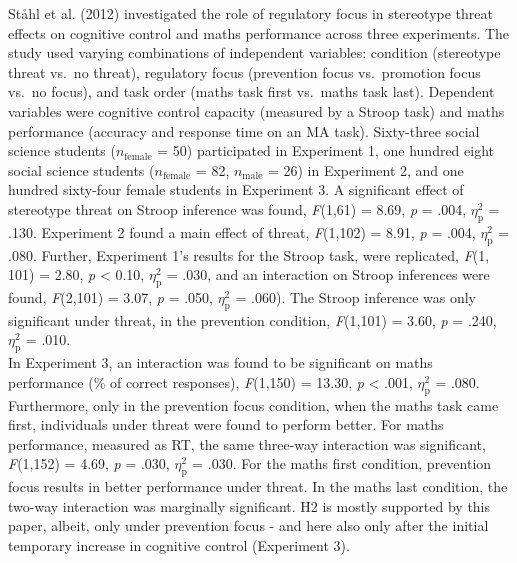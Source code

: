 \documentclass[
  stu, a4paper,floatsintext]{apa7}
\begin{document}
Ståhl et al. (2012) investigated the role of regulatory focus in stereotype threat effects on cognitive control and maths performance across three experiments.
The study used varying combinations of independent variables: condition (stereotype threat vs.~no threat), regulatory focus (prevention focus vs.~promotion focus vs.~no focus), and task order (maths task first vs.~maths task last).
Dependent variables were cognitive control capacity (measured by a Stroop task) and maths performance (accuracy and response time on an MA task).
Sixty-three social science students (\(n_{\text{female}}\) = 50) participated in Experiment 1, one hundred eight social science students (\(n_{\text{female}}\) = 82, \(n_{\text{male}}\) = 26) in Experiment 2, and one hundred sixty-four female students in Experiment 3.
A significant effect of stereotype threat on Stroop inference was found, \emph{F}(1,61) = 8.69, \emph{p} = .004, \(\eta^{2}_{\text{p}}\) = .130.
Experiment 2 found a main effect of threat, \emph{F}(1,102) = 8.91, \emph{p} = .004, \(\eta^{2}_{\text{p}}\) = .080.
Further, Experiment 1's results for the Stroop task, were replicated, \emph{F}(1, 101) = 2.80, \emph{p} \textless{} 0.10, \(\eta^{2}_{\text{p}}\) = .030, and an interaction on Stroop inferences were found, \emph{F}(2,101) = 3.07, \emph{p} = .050, \(\eta^{2}_{\text{p}}\) = .060).
The Stroop inference was only significant under threat, in the prevention condition, \emph{F}(1,101) = 3.60, \emph{p} = .240, \(\eta^{2}_{\text{p}}\) = .010.\\
In Experiment 3, an interaction was found to be significant on maths performance (\% of correct responses), \emph{F}(1,150) = 13.30, \emph{p} \textless{} .001, \(\eta^{2}_{\text{p}}\) = .080.
Furthermore, only in the prevention focus condition, when the maths task came first, individuals under threat were found to perform better.
For maths performance, measured as RT, the same three-way interaction was significant, \emph{F}(1,152) = 4.69, \emph{p} = .030, \(\eta^{2}_{\text{p}}\) = .030.
For the maths first condition, prevention focus results in better performance under threat.
In the maths last condition, the two-way interaction was marginally significant.
H2 is mostly supported by this paper, albeit, only under prevention focus - and here also only after the initial temporary increase in cognitive control (Experiment 3).
\end{document}
